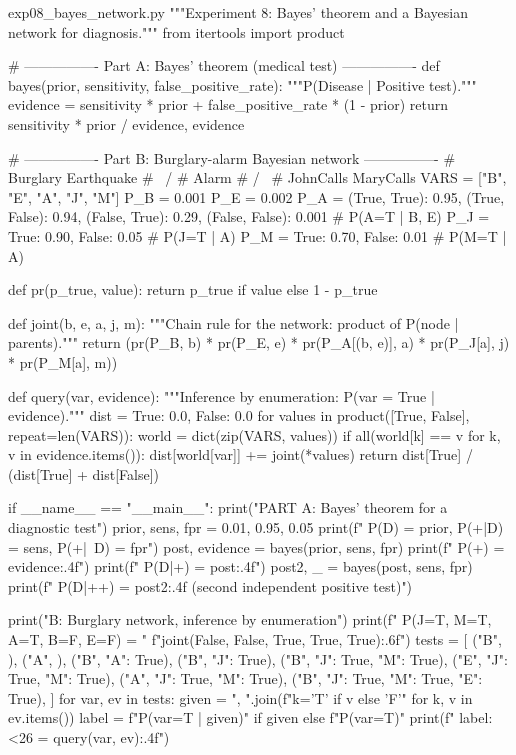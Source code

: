 \documentclass[11pt,a4paper]{article}
\begin{document}
\begin{pycode}{exp08\_bayes\_network.py}
"""Experiment 8: Bayes' theorem and a Bayesian network for diagnosis."""
from itertools import product


# ---------------- Part A: Bayes' theorem (medical test) ----------------
def bayes(prior, sensitivity, false_positive_rate):
    """P(Disease | Positive test)."""
    evidence = sensitivity * prior + false_positive_rate * (1 - prior)
    return sensitivity * prior / evidence, evidence


# ---------------- Part B: Burglary-alarm Bayesian network ----------------
#        Burglary     Earthquake
#              \       /
#                Alarm
#              /       \
#      JohnCalls     MaryCalls
VARS = ["B", "E", "A", "J", "M"]
P_B = 0.001
P_E = 0.002
P_A = {(True, True): 0.95, (True, False): 0.94,
       (False, True): 0.29, (False, False): 0.001}      # P(A=T | B, E)
P_J = {True: 0.90, False: 0.05}                         # P(J=T | A)
P_M = {True: 0.70, False: 0.01}                         # P(M=T | A)


def pr(p_true, value):
    return p_true if value else 1 - p_true


def joint(b, e, a, j, m):
    """Chain rule for the network: product of P(node | parents)."""
    return (pr(P_B, b) * pr(P_E, e) * pr(P_A[(b, e)], a)
            * pr(P_J[a], j) * pr(P_M[a], m))


def query(var, evidence):
    """Inference by enumeration: P(var = True | evidence)."""
    dist = {True: 0.0, False: 0.0}
    for values in product([True, False], repeat=len(VARS)):
        world = dict(zip(VARS, values))
        if all(world[k] == v for k, v in evidence.items()):
            dist[world[var]] += joint(*values)
    return dist[True] / (dist[True] + dist[False])


if __name__ == "__main__":
    print("PART A: Bayes' theorem for a diagnostic test")
    prior, sens, fpr = 0.01, 0.95, 0.05
    print(f"   P(D) = {prior}, P(+|D) = {sens}, P(+|~D) = {fpr}")
    post, evidence = bayes(prior, sens, fpr)
    print(f"   P(+)    = {evidence:.4f}")
    print(f"   P(D|+)  = {post:.4f}")
    post2, _ = bayes(post, sens, fpr)
    print(f"   P(D|++) = {post2:.4f}   (second independent positive test)")

    print("\nPART B: Burglary network, inference by enumeration")
    print(f"   P(J=T, M=T, A=T, B=F, E=F) = "
          f"{joint(False, False, True, True, True):.6f}")
    tests = [
        ("B", {}),
        ("A", {}),
        ("B", {"A": True}),
        ("B", {"J": True}),
        ("B", {"J": True, "M": True}),
        ("E", {"J": True, "M": True}),
        ("A", {"J": True, "M": True}),
        ("B", {"J": True, "M": True, "E": True}),
    ]
    for var, ev in tests:
        given = ", ".join(f"{k}={'T' if v else 'F'}" for k, v in ev.items())
        label = f"P({var}=T | {given})" if given else f"P({var}=T)"
        print(f"   {label:<26} = {query(var, ev):.4f}")
\end{pycode}
\end{document}
